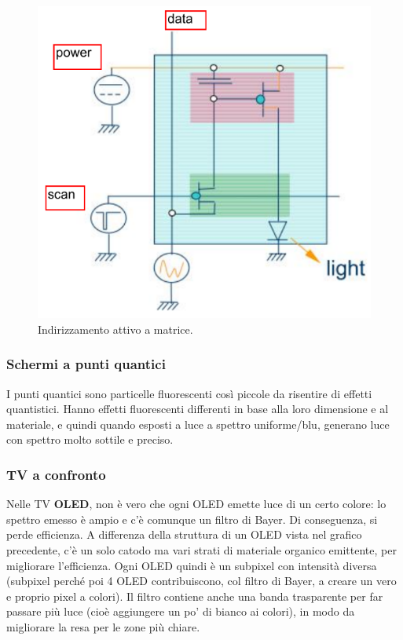 \documentclass[a4paper,11pt]{article}
\begin{document}
\renewcommand{\thefigure}{4.17}
\begin{figure}[!h]
  \centering
    \includegraphics[scale=0.4]{images/4/amoled_cell.png}
    \caption{Indirizzamento attivo a matrice.}
\end{figure}

\subsubsection{Schermi a punti quantici}
I punti quantici sono particelle fluorescenti così piccole da risentire di effetti quantistici. Hanno effetti fluorescenti differenti in base alla loro dimensione e al materiale,
e quindi quando esposti a luce a spettro uniforme/blu, generano luce con spettro molto sottile e preciso.

\subsubsection{TV a confronto}
Nelle TV \textbf{OLED}, non è vero che ogni OLED emette luce di un certo colore: lo spettro emesso è ampio e c'è comunque un filtro di Bayer.
Di conseguenza, si perde efficienza. A differenza della struttura di un OLED vista nel grafico precedente, c'è un solo
catodo ma vari strati di materiale organico emittente, per migliorare l'efficienza. Ogni OLED quindi è un subpixel con intensità
diversa (subpixel perché poi 4 OLED contribuiscono, col filtro di Bayer, a creare un vero e proprio pixel a colori).
Il filtro contiene anche una banda trasparente per far passare più luce (cioè aggiungere un po' di bianco ai colori), in
modo da migliorare la resa per le zone più chiare.
\end{document}
